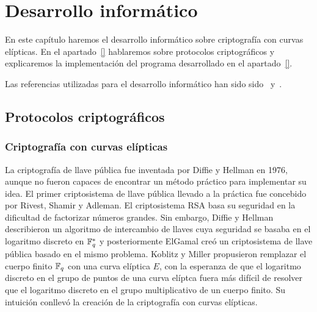 \chapter{Desarrollo informático}
\label{ch:Desarrollo informático}

En este capítulo haremos el desarrollo informático sobre criptografía con curvas elípticas. En el apartado~\ref{} hablaremos sobre protocolos criptográficos y explicaremos la implementación del programa desarrollado en el apartado~\ref{}.

Las referencias utilizadas para el desarrollo informático han sido sido~\cite{Hankerson:2003} y~\cite{Washington:2008}.

\section{Protocolos criptográficos}
\label{sec:Protocolos criptográficos}


\subsection{Criptografía con curvas elípticas}
\label{sub:Criptografía con curvas elípticas}

La criptografía de llave pública fue inventada por Diffie y Hellman en 1976, aunque no fueron capaces de encontrar un método práctico para implementar su idea. El primer criptosistema de llave pública llevado a la práctica fue concebido por Rivest, Shamir y Adleman. El criptosistema RSA basa su seguridad en la dificultad de factorizar números grandes. Sin embargo, Diffie y Hellman describieron un algoritmo de intercambio de llaves cuya seguridad se basaba en el logaritmo discreto en $\mathbb{F}_q^*$ y posteriormente ElGamal creó un criptosistema de llave pública basado en el mismo problema. Koblitz y Miller propusieron remplazar el cuerpo finito $\mathbb{F}_q$ con una curva elíptica $E$, con la esperanza de que el logaritmo discreto en el grupo de puntos de una curva elíptca fuera más difícil de resolver que el logaritmo discreto en el grupo multiplicativo de un cuerpo finito. Su intuición conllevó la creación de la criptografía con curvas elípticas.



